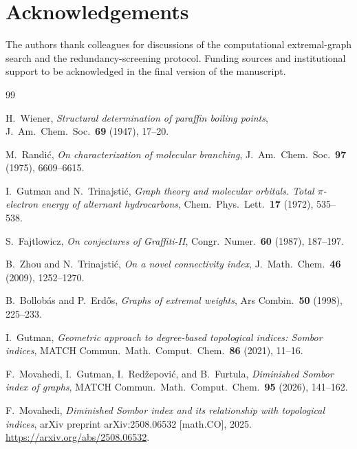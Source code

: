 \documentclass[11pt,a4paper]{article}
\theoremstyle{definition}
\begin{document}
\section*{Acknowledgements}

The authors thank colleagues for discussions of the computational
extremal-graph search and the redundancy-screening protocol.
Funding sources and institutional support to be acknowledged in
the final version of the manuscript.

\begin{thebibliography}{99}
\small

H.~Wiener,
\emph{Structural determination of paraffin boiling points},
J.~Am.~Chem.~Soc.~\textbf{69} (1947), 17--20.

M.~Randi\'c,
\emph{On characterization of molecular branching},
J.~Am.~Chem.~Soc.~\textbf{97} (1975), 6609--6615.

I.~Gutman and N.~Trinajsti\'c,
\emph{Graph theory and molecular orbitals. Total
$\pi$-electron energy of alternant hydrocarbons},
Chem.~Phys.~Lett.~\textbf{17} (1972), 535--538.

S.~Fajtlowicz,
\emph{On conjectures of Graffiti-II},
Congr.~Numer.~\textbf{60} (1987), 187--197.

B.~Zhou and N.~Trinajsti\'c,
\emph{On a novel connectivity index},
J.~Math.~Chem.~\textbf{46} (2009), 1252--1270.

B.~Bollob\'as and P.~Erd\H{o}s,
\emph{Graphs of extremal weights},
Ars Combin.~\textbf{50} (1998), 225--233.

I.~Gutman,
\emph{Geometric approach to degree-based topological indices: Sombor indices},
MATCH Commun.~Math.~Comput.~Chem.~\textbf{86} (2021), 11--16.

F.~Movahedi, I.~Gutman, I.~Red\v{z}epovi\'c, and B.~Furtula,
\emph{Diminished Sombor index of graphs},
MATCH Commun.~Math.~Comput.~Chem.~\textbf{95} (2026), 141--162.

F.~Movahedi,
\emph{Diminished Sombor index and its relationship with topological indices},
arXiv preprint arXiv:2508.06532 [math.CO], 2025.
\url{https://arxiv.org/abs/2508.06532}.


\end{thebibliography}
\end{document}
